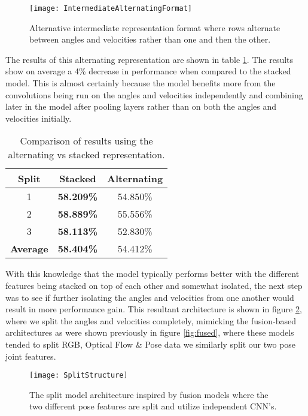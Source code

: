 \begin{figure}[ht]
	\texttt{[image: IntermediateAlternatingFormat]}
	\centering
	\caption{Alternative intermediate representation format where rows alternate between angles and velocities rather than one and then the other.}
	\label{fig:alternating-intermediate}
\end{figure}

The results of this alternating representation are shown in table \ref{tab:acc-results-v-alternating}. The results show on average a 4\% decrease in performance when compared to the stacked model. This is almost certainly because the model benefits more from the convolutions being run on the angles and velocities independently and combining later in the model after pooling layers rather than on both the angles and velocities initially.

\begin{table}[ht]
	\centering
	\begin{tabular}{||c c c||} 
		\hline
		\textbf{Split} & \textbf{Stacked} & \textbf{Alternating} \\ [0.5ex] 
		\hline\hline
		1 & \textbf{58.209\%} & 54.850\% \\ 
		\hline
		2 & \textbf{58.889\%} & 55.556\% \\
		\hline
		3 & \textbf{58.113\%} & 52.830\% \\
		\hline
		\hline
		\textbf{Average} & \textbf{58.404\%} & 54.412\% \\
		\hline
	\end{tabular}
	\caption{Comparison of results using the alternating vs stacked representation.}
	\label{tab:acc-results-v-alternating}
\end{table}

With this knowledge that the model typically performs better with the different features being stacked on top of each other and somewhat isolated, the next step was to see if further isolating the angles and velocities from one another would result in more performance gain. This resultant architecture is shown in figure \ref{fig:split-architecture}, where we split the angles and velocities completely, mimicking the fusion-based architectures as were shown previously in figure \ref{fig:fused}, where these models tended to split RGB, Optical Flow \& Pose data we similarly split our two pose joint features.

\begin{figure}[ht]
	\texttt{[image: SplitStructure]}
	\centering
	\caption{The split model architecture inspired by fusion models where the two different pose features are split and utilize independent CNN's.}
	\label{fig:split-architecture}
\end{figure}

